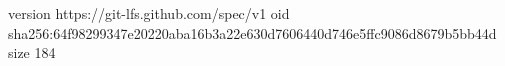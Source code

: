 version https://git-lfs.github.com/spec/v1
oid sha256:64f98299347e20220aba16b3a22e630d7606440d746e5ffc9086d8679b5bb44d
size 184
